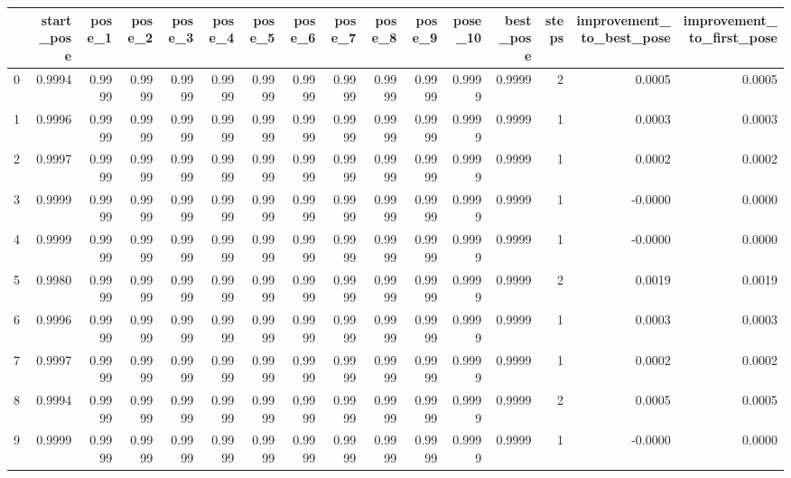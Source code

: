 \begin{tabular}{lrrrrrrrrrrrrrrr}
\toprule
{} &  start\_pose &  pose\_1 &  pose\_2 &  pose\_3 &  pose\_4 &  pose\_5 &  pose\_6 &  pose\_7 &  pose\_8 &  pose\_9 &  pose\_10 &  best\_pose &  steps &  improvement\_to\_best\_pose &  improvement\_to\_first\_pose \\
\midrule
0   &      0.9994 &  0.9999 &  0.9999 &  0.9999 &  0.9999 &  0.9999 &  0.9999 &  0.9999 &  0.9999 &  0.9999 &   0.9999 &     0.9999 &      2 &                    0.0005 &                     0.0005 \\
1   &      0.9996 &  0.9999 &  0.9999 &  0.9999 &  0.9999 &  0.9999 &  0.9999 &  0.9999 &  0.9999 &  0.9999 &   0.9999 &     0.9999 &      1 &                    0.0003 &                     0.0003 \\
2   &      0.9997 &  0.9999 &  0.9999 &  0.9999 &  0.9999 &  0.9999 &  0.9999 &  0.9999 &  0.9999 &  0.9999 &   0.9999 &     0.9999 &      1 &                    0.0002 &                     0.0002 \\
3   &      0.9999 &  0.9999 &  0.9999 &  0.9999 &  0.9999 &  0.9999 &  0.9999 &  0.9999 &  0.9999 &  0.9999 &   0.9999 &     0.9999 &      1 &                   -0.0000 &                     0.0000 \\
4   &      0.9999 &  0.9999 &  0.9999 &  0.9999 &  0.9999 &  0.9999 &  0.9999 &  0.9999 &  0.9999 &  0.9999 &   0.9999 &     0.9999 &      1 &                   -0.0000 &                     0.0000 \\
5   &      0.9980 &  0.9999 &  0.9999 &  0.9999 &  0.9999 &  0.9999 &  0.9999 &  0.9999 &  0.9999 &  0.9999 &   0.9999 &     0.9999 &      2 &                    0.0019 &                     0.0019 \\
6   &      0.9996 &  0.9999 &  0.9999 &  0.9999 &  0.9999 &  0.9999 &  0.9999 &  0.9999 &  0.9999 &  0.9999 &   0.9999 &     0.9999 &      1 &                    0.0003 &                     0.0003 \\
7   &      0.9997 &  0.9999 &  0.9999 &  0.9999 &  0.9999 &  0.9999 &  0.9999 &  0.9999 &  0.9999 &  0.9999 &   0.9999 &     0.9999 &      1 &                    0.0002 &                     0.0002 \\
8   &      0.9994 &  0.9999 &  0.9999 &  0.9999 &  0.9999 &  0.9999 &  0.9999 &  0.9999 &  0.9999 &  0.9999 &   0.9999 &     0.9999 &      2 &                    0.0005 &                     0.0005 \\
9   &      0.9999 &  0.9999 &  0.9999 &  0.9999 &  0.9999 &  0.9999 &  0.9999 &  0.9999 &  0.9999 &  0.9999 &   0.9999 &     0.9999 &      1 &                   -0.0000 &                     0.0000 \\

\end{tabular}
